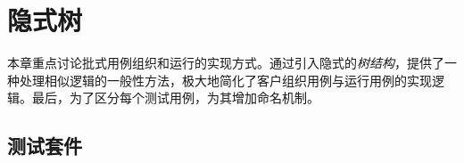 \begin{savequote}[45mm]
\end{savequote}

\chapter{隐式树} 
\label{ch:implicit-tree}

\begin{content}

本章重点讨论批式用例组织和运行的实现方式。通过引入隐式的\emph{树结构}，提供了一种处理相似逻辑的一般性方法，极大地简化了客户组织用例与运行用例的实现逻辑。最后，为了区分每个测试用例，为其增加命名机制。

\end{content}

\section{测试套件}

